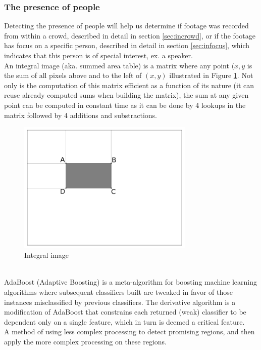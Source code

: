 \subsubsection{The presence of people}
%
%
Detecting the presence of people will help us determine if footage was recorded from within a crowd, described in detail in section \ref{sec:incrowd}, or if the footage has focus on a specific person, described in detail in section \ref{sec:infocus}, which indicates that this person is of special interest, ex. a speaker.\\
An integral image (aka. summed area table) is a matrix where any point $(x,y$ is the sum of all pixels above and to the left of $(x,y)$ illustrated in Figure \ref{fig:integral_img}. Not only is the computation of this matrix efficient as a function of its nature (it can reuse already computed sums when building the matrix), the sum at any given point can be computed in constant time as it can be done by 4 lookups in the matrix followed by 4 additions and substractions.
%
\begin{figure}[h]
     \centering
     \includegraphics[width=0.75\textwidth]{img/integral_image.png}
     \caption{Integral image}\label{fig:integral_img}
\end{figure}\\
%
AdaBoost (Adaptive Boosting) is a meta-algorithm for boosting machine learning algorithms where subsequent classifiers built are tweaked in favor of those instances misclassified by previous classifiers. The derivative algorithm is a modification of AdaBoost that constrains each returned (weak) classifier to be dependent only on a single feature, which in turn is deemed a critical feature.\\
A method of using less complex processing to detect promising regions, and then apply the more complex processing on these regions.\\\\
